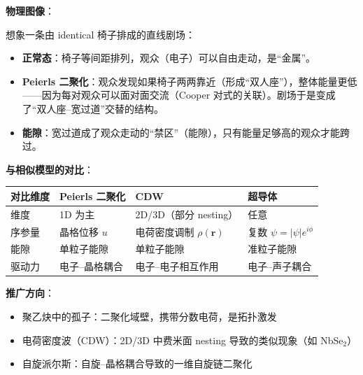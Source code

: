 \begin{insightbox}[物理图像与模型关联]
\textbf{物理图像}：

想象一条由 identical 椅子排成的直线剧场：
\begin{itemize}[nosep]
    \item \textbf{正常态}：椅子等间距排列，观众（电子）可以自由走动，是``金属''。
    \item \textbf{Peierls 二聚化}：观众发现如果椅子两两靠近（形成``双人座''），整体能量更低——因为每对观众可以面对面交流（Cooper 对式的关联）。剧场于是变成了``双人座--宽过道''交替的结构。
    \item \textbf{能隙}：宽过道成了观众走动的``禁区''（能隙），只有能量足够高的观众才能跨过。
\end{itemize}

\textbf{与相似模型的对比}：
\begin{center}
\begin{tabular}{llll}
\toprule
\textbf{对比维度} & \textbf{Peierls 二聚化} & \textbf{CDW} & \textbf{超导体} \\
\midrule
维度 & 1D 为主 & 2D/3D（部分 nesting） & 任意 \\
序参量 & 晶格位移 $u$ & 电荷密度调制 $\rho(\mathbf{r})$ & 复数 $\psi=|\psi|e^{i\phi}$ \\
能隙 & 单粒子能隙 & 单粒子能隙 & 准粒子能隙 \\
驱动力 & 电子--晶格耦合 & 电子--电子相互作用 & 电子--声子耦合 \\
\bottomrule
\end{tabular}
\end{center}

\textbf{推广方向}：
\begin{itemize}[nosep]
    \item 聚乙炔中的孤子：二聚化域壁，携带分数电荷，是拓扑激发
    \item 电荷密度波（CDW）：2D/3D 中费米面 nesting 导致的类似现象（如 NbSe$_2$）
    \item 自旋派尔斯：自旋--晶格耦合导致的一维自旋链二聚化
\end{itemize}
\end{insightbox}

